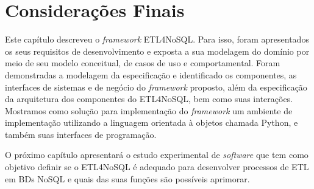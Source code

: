 







\section{Considerações Finais}

Este capítulo descreveu o \textit{framework} ETL4NoSQL. Para isso, foram apresentados os seus requisitos de desenvolvimento e exposta a sua modelagem do domínio por meio de seu modelo conceitual, de casos de uso e comportamental. Foram demonstradas a modelagem da especificação e identificado os componentes, as interfaces de sistemas e de negócio do \textit{framework} proposto, além da especificação da arquitetura dos componentes do ETL4NoSQL, bem como suas interações. Mostramos como solução para implementação do \textit{framework} um ambiente de implementação utilizando a linguagem orientada à objetos chamada Python, e também suas interfaces de programação.

O próximo capítulo apresentará o estudo experimental de \textit{software} que tem como objetivo definir se o ETL4NoSQL é adequado para desenvolver processos de ETL em BDs NoSQL e quais das suas funções são possíveis aprimorar.



